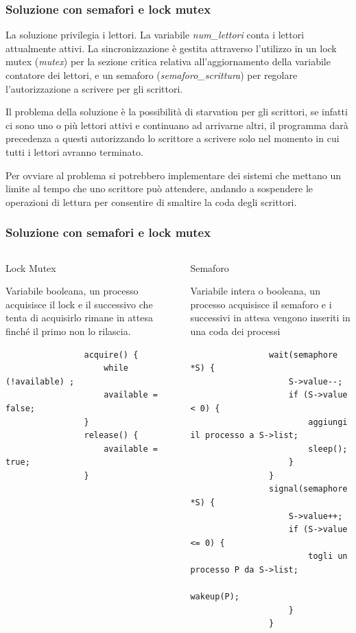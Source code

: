 \documentclass[10pt]{beamer}
\begin{document}
\begin{frame}[fragile]
	\frametitle{Soluzione con semafori e lock mutex}
	La soluzione privilegia i lettori.
	La variabile \emph{num\_lettori} conta i lettori attualmente attivi. La sincronizzazione è gestita attraverso l'utilizzo in un lock mutex (\emph{mutex}) per la sezione critica relativa all'aggiornamento della variabile contatore dei lettori, e un semaforo (\emph{semaforo\_scrittura}) per regolare l'autorizzazione a scrivere per gli scrittori.
	
	Il problema della soluzione è la possibilità di starvation per gli scrittori, se infatti ci sono uno o più lettori attivi e continuano ad arrivarne altri, il programma darà precedenza a questi autorizzando lo scrittore a scrivere solo nel momento in cui tutti i lettori avranno terminato.
	
	Per ovviare al problema si potrebbero implementare dei sistemi che mettano un limite al tempo che uno scrittore può attendere, andando a sospendere le operazioni di lettura per consentire di smaltire la coda degli scrittori.
\end{frame}

\begin{frame}[fragile]
	\frametitle{Soluzione con semafori e lock mutex}
	\begin{columns}
		\begin{column}{0.4\textwidth}
			Lock Mutex
			
			Variabile booleana, un processo acquisisce il lock e il successivo che tenta di acquisirlo rimane in attesa finché il primo non lo rilascia.
			
			\begin{verbatim}
				acquire() {
					while (!available) ;
					available = false;
				}
				release() {
					available = true;
				}
			
		\end{verbatim}
		\end{column}
		\begin{column}{0.4\textwidth}
			Semaforo
			
			Variabile intera o booleana, un processo acquisisce il semaforo e i successivi in attesa vengono inseriti in una coda dei processi
			
			\begin{verbatim}
				wait(semaphore *S) {
					S->value--;
					if (S->value < 0) {
						aggiungi il processo a S->list;
						sleep();
					}
				}
				signal(semaphore *S) {
					S->value++;
					if (S->value <= 0) {
						togli un processo P da S->list;
						wakeup(P);
					}	
				}
			\end{verbatim}
		\end{column}
	\end{columns}
\end{frame}
\end{document}
